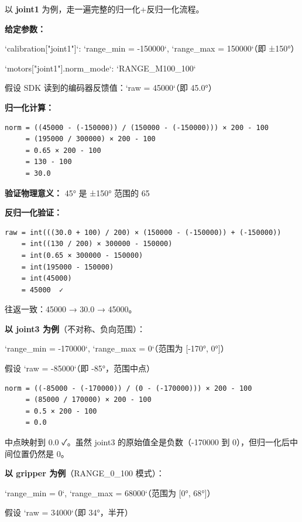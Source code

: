\documentclass[UTF8,a4paper,11pt]{ctexart}
\begin{document}
{以 \textbf{joint1} 为例，走一遍完整的归一化+反归一化流程。

\textbf{给定参数：}

\item `calibration["joint1"]`: `range_min = -150000`, `range_max = 150000`（即 ±150°）
\item `motors["joint1"].norm_mode`: `RANGE_M100_100`
\item 假设 SDK 读到的编码器反馈值：`raw = 45000`（即 45.0°）

\textbf{归一化计算：}

\begin{lstlisting}[language=text]
norm = ((45000 - (-150000)) / (150000 - (-150000))) × 200 - 100
     = (195000 / 300000) × 200 - 100
     = 0.65 × 200 - 100
     = 130 - 100
     = 30.0
\end{lstlisting}

\textbf{验证物理意义：} 45° 是 ±150° 范围的 65%

\textbf{反归一化验证：}

\begin{lstlisting}[language=text]
raw = int(((30.0 + 100) / 200) × (150000 - (-150000)) + (-150000))
    = int((130 / 200) × 300000 - 150000)
    = int(0.65 × 300000 - 150000)
    = int(195000 - 150000)
    = int(45000)
    = 45000  ✓
\end{lstlisting}

往返一致：45000 → 30.0 → 45000。

\textbf{以 joint3 为例}（不对称、负向范围）：

\item `range_min = -170000`, `range_max = 0`（范围为 [-170°, 0°]）
\item 假设 `raw = -85000`（即 -85°，范围中点）

\begin{lstlisting}[language=text]
norm = ((-85000 - (-170000)) / (0 - (-170000))) × 200 - 100
     = (85000 / 170000) × 200 - 100
     = 0.5 × 200 - 100
     = 0.0
\end{lstlisting}

中点映射到 0.0 ✓。虽然 joint3 的原始值全是负数（-170000 到 0），但归一化后中间位置仍然是 0。

\textbf{以 gripper 为例}（RANGE_0_100 模式）：

\item `range_min = 0`, `range_max = 68000`（范围为 [0°, 68°]）
\item 假设 `raw = 34000`（即 34°，半开）

}
\end{document}

